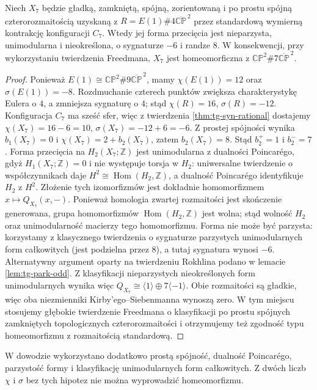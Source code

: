 \begin{twierdzenie}
\label{thm:tg-syn-park-homeo}
Niech $X_7$ będzie gładką, zamkniętą, spójną,
zorientowaną i po prostu spójną czterorozmaitością
uzyskaną z $R=E(1)\#4\overline{\mathbb{CP}}^{\,2}$
przez standardową wymierną kontrakcję konfiguracji $C_7$.
Wtedy jej forma przecięcia jest nieparzysta, unimodularna
i nieokreślona, o sygnaturze $-6$ i randze $8$.
W konsekwencji, przy wykorzystaniu twierdzenia Freedmana,
$X_7$ jest homeomorficzna z
$\mathbb{CP}^2\#7\overline{\mathbb{CP}}^{\,2}$.
\end{twierdzenie}

\begin{proof}
Ponieważ $E(1)\cong\mathbb{CP}^2\#9\overline{\mathbb{CP}}^{\,2}$,
mamy $\chi(E(1))=12$ oraz $\sigma(E(1))=-8$.
Rozdmuchanie czterech punktów zwiększa charakterystykę Eulera
o $4$, a zmniejsza sygnaturę o $4$; stąd
$\chi(R)=16$, $\sigma(R)=-12$.
Konfiguracja $C_7$ ma sześć sfer, więc
z twierdzenia \ref{thm:tg-syn-rational} dostajemy
$\chi(X_7)=16-6=10$, $\sigma(X_7)=-12+6=-6$.
Z prostej spójności wynika $b_1(X_7)=0$ i
$\chi(X_7)=2+b_2(X_7)$, zatem $b_2(X_7)=8$.
Stąd $b_2^+=1$ i $b_2^-=7$. Forma przecięcia
na $H_2(X_7;\mathbb Z)$ jest unimodularna
z dualności Poincar\'ego, gdyż $H_1(X_7;\mathbb Z)=0$
i nie występuje torsja w $H_2$:
uniwersalne twierdzenie o współczynnikach daje
$H^2\cong\operatorname{Hom}(H_2,\mathbb Z)$,
a dualność Poincarégo identyfikuje $H_2$ z $H^2$.
Złożenie tych izomorfizmów jest dokładnie
homomorfizmem $x\mapsto Q_{X_7}(x,-)$.
Ponieważ homologia zwartej rozmaitości jest
skończenie generowana, grupa homomorfizmów
$\operatorname{Hom}(H_2,\mathbb Z)$ jest wolna;
stąd wolność $H_2$ oraz unimodularność macierzy
tego homomorfizmu.
Forma nie może być parzysta: korzystamy z klasycznego
twierdzenia o sygnaturze parzystych unimodularnych
form całkowitych (jest podzielna przez $8$),
a tutaj sygnatura wynosi $-6$. Alternatywny argument
oparty na twierdzeniu Rokhlina podano w lemacie
\ref{lem:tg-park-odd}. Z klasyfikacji nieparzystych
nieokreślonych form unimodularnych wynika więc
$Q_{X_7}\cong\langle1\rangle\oplus7\langle-1\rangle$.
Obie rozmaitości są gładkie, więc oba niezmienniki
Kirby'ego--Siebenmanna wynoszą zero. W tym miejscu stosujemy
głębokie twierdzenie Freedmana o klasyfikacji po prostu spójnych
zamkniętych topologicznych czterorozmaitości i otrzymujemy
też zgodność typu homeomorfizmu z rozmaitością standardową.
\end{proof}

\begin{uwaga}
W dowodzie wykorzystano dodatkowo prostą spójność, dualność
Poincar\'ego, parzystość formy i klasyfikację unimodularnych
form całkowitych. Z dwóch liczb $\chi$ i $\sigma$ bez tych
hipotez nie można wyprowadzić homeomorfizmu.
\end{uwaga}

